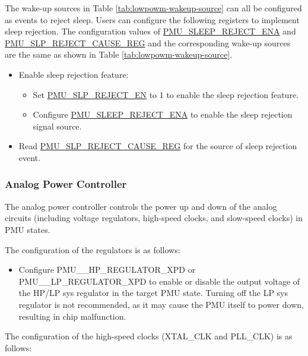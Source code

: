 \documentclass[main\_\_EN.tex]{subfiles}
\begin{document}
The wake-up sources in Table \ref{tab:lowpowm-wakeup-source} can all be configured as events to reject sleep. Users can configure the following registers to implement sleep rejection. The configuration values of \hyperref[fielddesc:PMUSLEEPREJECTENA]{PMU\_SLEEP\_REJECT\_ENA} and \hyperref[fielddesc:PMUREJECTCAUSE]{PMU\_SLP\_REJECT\_CAUSE\_REG} and the corresponding wake-up sources are the same as shown in Table \ref{tab:lowpowm-wakeup-source}.

\begin{itemize}
    \item Enable sleep rejection feature:
    \begin{itemize}
        \item Set \hyperref[fielddesc:PMUSLPREJECTEN]{PMU\_SLP\_REJECT\_EN} to 1 to enable the sleep rejection feature.
        \item Configure \hyperref[fielddesc:PMUSLEEPREJECTENA]{PMU\_SLEEP\_REJECT\_ENA} to enable the sleep rejection signal source.
    \end{itemize}
    \item Read \hyperref[fielddesc:PMUREJECTCAUSE]{PMU\_SLP\_REJECT\_CAUSE\_REG} for the source of sleep rejection event.
\end{itemize}

\subsubsection{Analog Power Controller}\label{sec:lowpowm_analog_power_controller}

The analog power controller controls the power up and down of the analog circuits (including voltage regulators, high-speed clocks, and slow-speed clocks) in PMU states.

The configuration of the regulators is as follows:

\begin{itemize}
    \item Configure PMU\_\_HP\_REGULATOR\_XPD or PMU\_\_LP\_REGULATOR\_XPD to enable or disable the output voltage of the HP/LP sys regulator in the target PMU state. Turning off the LP sys regulator is not recommended, as it may cause the PMU itself to power down, resulting in chip malfunction.
\end{itemize}

The configuration of the high-speed clocks (XTAL\_CLK and PLL\_CLK) is as follows:
\end{document}
